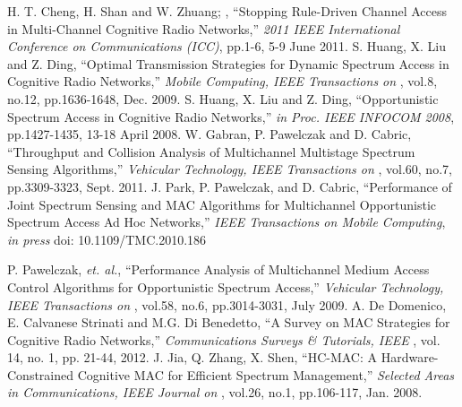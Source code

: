 \begin{thebibliography}{1}
 H. T. Cheng, H. Shan and W. Zhuang; , ``Stopping Rule-Driven Channel Access in Multi-Channel Cognitive Radio Networks,'' \emph{2011 IEEE International Conference on Communications (ICC)}, pp.1-6, 5-9 June 2011.
 S. Huang, X. Liu and Z. Ding, ``Optimal Transmission Strategies for Dynamic Spectrum Access in Cognitive Radio Networks,'' \emph{Mobile Computing, IEEE Transactions on }, vol.8, no.12, pp.1636-1648, Dec. 2009.
 S. Huang, X. Liu and Z. Ding, ``Opportunistic Spectrum Access in Cognitive Radio Networks,'' \emph{in Proc. IEEE INFOCOM 2008}, pp.1427-1435, 13-18 April 2008.
 W. Gabran, P. Pawelczak and D. Cabric, ``Throughput and Collision Analysis of Multichannel Multistage Spectrum Sensing Algorithms,'' \emph{Vehicular Technology, IEEE Transactions on }, vol.60, no.7, pp.3309-3323, Sept. 2011.
 J. Park, P. Pawelczak, and D. Cabric, ``Performance of Joint Spectrum Sensing and MAC Algorithms for Multichannel Opportunistic Spectrum Access Ad Hoc Networks,'' \emph{ IEEE Transactions on Mobile Computing}, \textit{in press} doi: 10.1109/TMC.2010.186













 P. Pawelczak, \textit{et. al.}, ``Performance Analysis of Multichannel Medium Access Control Algorithms for Opportunistic Spectrum Access,'' \emph{Vehicular Technology, IEEE Transactions on }, vol.58, no.6, pp.3014-3031, July 2009.
 A. De Domenico, E. Calvanese Strinati and M.G. Di Benedetto, ``A Survey on MAC Strategies for Cognitive Radio Networks,'' \emph{Communications Surveys \& Tutorials, IEEE }, vol. 14, no. 1, pp. 21-44, 2012.
 J. Jia, Q. Zhang, X. Shen, ``HC-MAC: A Hardware-Constrained Cognitive MAC for Efficient Spectrum Management,'' \emph{Selected Areas in Communications, IEEE Journal on }, vol.26, no.1, pp.106-117, Jan. 2008.


\end{thebibliography}
